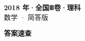 \documentclass[zihao=-4, a4paper]{ctexart}
\begin{document}
\begin{center}
  {\Large\bfseries 2018 年·全国Ⅲ卷·理科}\\[4pt]
  {\large 数学 · 简答版}
\end{center}
\medskip
{}

\clearpage
{}
\begin{center}{\Large\bfseries 答案速查}\end{center}
\medskip

\end{document}
